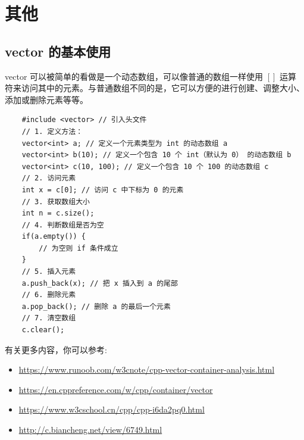 \documentclass[12pt,a4paper]{article}
\begin{document}
\section{其他}

\subsection{vector 的基本使用}

vector 可以被简单的看做是一个动态数组，可以像普通的数组一样使用 $[]$ 运算符来访问其中的元素。与普通数组不同的是，它可以方便的进行创建、调整大小、添加或删除元素等等。
\begin{lstlisting}
    #include <vector> // 引入头文件
    // 1. 定义方法：
    vector<int> a; // 定义一个元素类型为 int 的动态数组 a
    vector<int> b(10); // 定义一个包含 10 个 int（默认为 0） 的动态数组 b
    vector<int> c(10, 100); // 定义一个包含 10 个 100 的动态数组 c
    // 2. 访问元素
    int x = c[0]; // 访问 c 中下标为 0 的元素
    // 3. 获取数组大小
    int n = c.size();
    // 4. 判断数组是否为空
    if(a.empty()) {
        // 为空则 if 条件成立
    }
    // 5. 插入元素
    a.push_back(x); // 把 x 插入到 a 的尾部
    // 6. 删除元素
    a.pop_back(); // 删除 a 的最后一个元素
    // 7. 清空数组
    c.clear();
\end{lstlisting}

有关更多内容，你可以参考:

\begin{itemize}[noitemsep]
    \item \href{https://www.runoob.com/w3cnote/cpp-vector-container-analysis.html}{https://www.runoob.com/w3cnote/cpp-vector-container-analysis.html}
    \item \href{https://en.cppreference.com/w/cpp/container/vector}{https://en.cppreference.com/w/cpp/container/vector}
    \item \href{https://www.w3cschool.cn/cpp/cpp-i6da2pq0.html}{https://www.w3cschool.cn/cpp/cpp-i6da2pq0.html}
    \item \href{http://c.biancheng.net/view/6749.html}{http://c.biancheng.net/view/6749.html}
\end{itemize}
\end{document}

